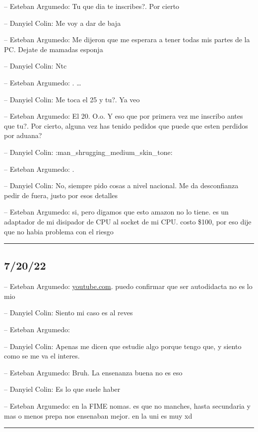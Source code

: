 -- Esteban Argumedo: Tu que dia te inscribes?. Por cierto

-- Danyiel Colin: Me voy a dar de baja

-- Esteban Argumedo: Me dijeron que me esperara a tener todas mis partes
de la PC. Dejate de mamadas esponja

-- Danyiel Colin: Ntc

-- Esteban Argumedo: . \ldots{}

-- Danyiel Colin: Me toca el 25 y tu?. Ya veo

-- Esteban Argumedo: El 20. O.o. Y eso que por primera vez me inscribo
antes que tu?. Por cierto, alguna vez has tenido pedidos que puede que
esten perdidos por aduana?

-- Danyiel Colin: :man\_shrugging\_medium\_skin\_tone:

-- Esteban Argumedo: .

-- Danyiel Colin: No, siempre pido cosas a nivel nacional. Me da
desconfianza pedir de fuera, justo por esos detalles

-- Esteban Argumedo: si, pero digamos que esto amazon no lo tiene. es un
adaptador de mi disipador de CPU al socket de mi CPU. costo \$100, por
eso dije que no habia problema con el riesgo

\begin{center}\rule{0.5\linewidth}{0.5pt}\end{center}

\hypertarget{section-128}{%
\subsection{7/20/22}\label{section-128}}

-- Esteban Argumedo:
\href{https://www.youtube.com/watch?v=g7MSfHEdxXs\&t=29s}{youtube.com}.
puedo confirmar que ser autodidacta no es lo mio

-- Danyiel Colin: Siento mi caso es al reves

-- Esteban Argumedo:

-- Danyiel Colin: Apenas me dicen que estudie algo porque tengo que, y
siento como se me va el interes.

-- Esteban Argumedo: Bruh. La ensenanza buena no es eso

-- Danyiel Colin: Es lo que suele haber

-- Esteban Argumedo: en la FIME nomas. es que no manches, hasta
secundaria y mas o menos prepa nos ensenaban mejor. en la uni es muy xd

\begin{center}\rule{0.5\linewidth}{0.5pt}\end{center}

